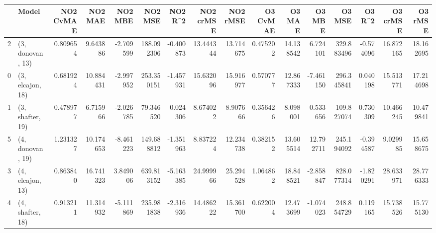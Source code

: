 \begin{tabular}{llrrrrrrrrrrrrrr}
\toprule
{} &             Model &  NO2 CvMAE &    NO2 MAE &   NO2 MBE &     NO2 MSE &   NO2 R\textasciicircum2 &  NO2 crMSE &   NO2 rMSE &  O3 CvMAE &     O3 MAE &     O3 MBE &      O3 MSE &    O3 R\textasciicircum2 &   O3 crMSE &    O3 rMSE \\
\midrule
2 &  (3, donovan, 13) &   0.809654 &   9.643886 & -2.709599 &  188.092306 & -0.400873 &  13.444344 &  13.714675 &  0.475202 &  14.138542 &   6.724101 &  329.883496 & -0.574096 &  16.872165 &  18.162695 \\
0 &  (3, elcajon, 18) &   0.681924 &  10.884431 & -2.997952 &  253.350151 & -1.457931 &  15.632096 &  15.916977 &  0.570777 &  12.867333 &  -7.461150 &  296.345841 &  0.040198 &  15.513771 &  17.214698 \\
1 &  (3, shafter, 19) &   0.478977 &   6.715966 & -2.026785 &   79.346520 &  0.024306 &   8.674022 &   8.907666 &  0.356426 &   8.098001 &   0.533656 &  109.827074 &  0.730309 &  10.466245 &  10.479841 \\
5 &  (4, donovan, 19) &   1.231327 &  10.174653 & -8.461223 &  149.688812 & -1.351963 &   8.837224 &  12.234738 &  0.382152 &  13.605514 &  12.792711 &  245.194092 & -0.394587 &   9.029985 &  15.658675 \\
3 &  (4, elcajon, 13) &   0.863840 &  16.741323 &  3.849006 &  639.813152 & -5.163385 &  24.999966 &  25.294528 &  1.064862 &  18.848521 &  -2.858847 &  828.077314 & -1.820291 &  28.633971 &  28.776333 \\
4 &  (4, shafter, 18) &   0.913211 &  11.314932 & -5.111869 &  235.981838 & -2.316936 &  14.486222 &  15.361700 &  0.622004 &  12.473699 &  -1.074023 &  248.854729 &  0.119165 &  15.738526 &  15.775130 \\
\bottomrule
\end{tabular}
